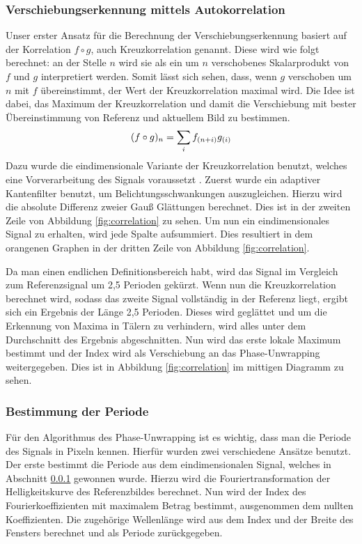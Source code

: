 \documentclass[10pt,a4paper]{scrarticle}
\begin{document}
		\subsubsection{Verschiebungserkennung mittels Autokorrelation}\label{Autokorrelation}
		Unser erster Ansatz für die Berechnung der Verschiebungserkennung basiert auf der Korrelation $f\circ g$, auch Kreuzkorrelation genannt. Diese wird wie folgt berechnet: an der Stelle $n$ wird sie als ein um $n$ verschobenes Skalarprodukt von $f$ und $g$ interpretiert werden. Somit lässt sich sehen, dass, wenn $g$ verschoben um $n$ mit $f$ übereinstimmt, der Wert der Kreuzkorrelation maximal wird. Die Idee ist dabei, das Maximum der Kreuzkorrelation und damit die Verschiebung mit bester Übereinstimmung von Referenz und aktuellem Bild zu bestimmen.
 		\begin{equation}
		    (f\circ g)_n=\sum_i f_{\left(n+i\right)}g_{\left(i\right)}\\
		\end{equation}
		Dazu wurde die eindimensionale Variante der Kreuzkorrelation benutzt, welches eine Vorverarbeitung des Signals voraussetzt . Zuerst wurde ein adaptiver Kantenfilter benutzt, um Belichtungsschwankungen auszugleichen. Hierzu wird die absolute Differenz zweier Gauß Glättungen berechnet. Dies ist in der zweiten Zeile von Abbildung \ref{fig:correlation} zu sehen. Um nun ein eindimensionales Signal zu erhalten, wird jede Spalte aufsummiert. Dies resultiert in dem orangenen Graphen in der dritten Zeile von Abbildung \ref{fig:correlation}.
		
		Da man einen endlichen Definitionsbereich habt, wird das Signal im Vergleich zum Referenzsignal um 2,5 Perioden gekürzt. Wenn nun die Kreuzkorrelation berechnet wird, sodass das zweite Signal vollständig in der Referenz liegt, ergibt sich ein Ergebnis der Länge 2,5 Perioden. Dieses wird geglättet und um die Erkennung von Maxima in Tälern zu verhindern, wird alles unter dem Durchschnitt des Ergebnis abgeschnitten.
		Nun wird das erste lokale Maximum bestimmt und der Index wird als Verschiebung an das Phase-Unwrapping weitergegeben. Dies ist in Abbildung \ref{fig:correlation} im mittigen Diagramm zu sehen.
		
		\subsubsection{Bestimmung der Periode}
		Für den Algorithmus des Phase-Unwrapping ist es wichtig, dass man die Periode des Signals in Pixeln kennen. Hierfür wurden zwei verschiedene Ansätze benutzt.
		Der erste bestimmt die Periode aus dem eindimensionalen Signal, welches in Abschnitt \ref{Autokorrelation} gewonnen wurde. Hierzu wird die Fouriertransformation der Helligkeitskurve des Referenzbildes berechnet. Nun wird der Index des Fourierkoeffizienten mit maximalem Betrag bestimmt, ausgenommen dem nullten Koeffizienten. Die zugehörige Wellenlänge wird aus dem Index und der Breite des Fensters berechnet und als Periode zurückgegeben.
		
\end{document}
